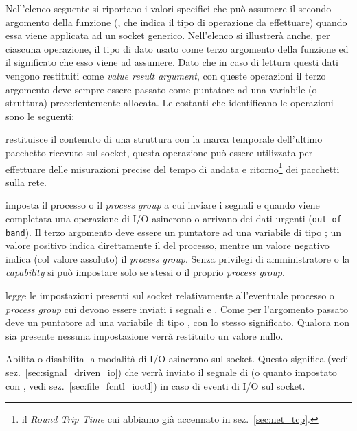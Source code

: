 Nell'elenco seguente si riportano i valori specifici che può assumere il
secondo argomento della funzione  (, che indica il
tipo di operazione da effettuare) quando essa viene applicata ad un socket
generico. Nell'elenco si illustrerà anche, per ciascuna operazione, il tipo di
dato usato come terzo argomento della funzione ed il significato che esso
viene ad assumere.  Dato che in caso di lettura questi dati vengono restituiti
come \textit{value result argument}, con queste operazioni il terzo argomento
deve sempre essere passato come puntatore ad una variabile (o struttura)
precedentemente allocata. Le costanti che identificano le operazioni sono le
seguenti:
\begin{basedescript}{\desclabelwidth{1.5cm}\desclabelstyle{\nextlinelabel}}
\item[\constd{SIOCGSTAMP}] restituisce il contenuto di una struttura
   con la marca temporale dell'ultimo pacchetto ricevuto sul
  socket, questa operazione può essere utilizzata per effettuare delle
  misurazioni precise del tempo di andata e ritorno\footnote{il \textit{Round
      Trip Time} cui abbiamo già accennato in sez.~\ref{sec:net_tcp}.} dei
  pacchetti sulla rete.

\item[\constd{SIOCSPGRP}] imposta il processo o il \textit{process group} a
  cui inviare i segnali  e  quando viene
  completata una operazione di I/O asincrono o arrivano dei dati urgenti
  (\texttt{out-of-band}). Il terzo argomento deve essere un puntatore ad una
  variabile di tipo ; un valore positivo indica direttamente il
   del processo, mentre un valore negativo indica (col valore
  assoluto) il \textit{process group}. Senza privilegi di amministratore o la
  \textit{capability}  si può impostare solo se stessi o il
  proprio \textit{process group}.

\item[\constd{SIOCGPGRP}] legge le impostazioni presenti sul socket
  relativamente all'eventuale processo o \textit{process group} cui devono
  essere inviati i segnali  e . Come per
   l'argomento passato deve un puntatore ad una variabile di
  tipo , con lo stesso significato.  Qualora non sia presente
  nessuna impostazione verrà restituito un valore nullo.

\item[\const{FIOASYNC}] Abilita o disabilita la modalità di I/O asincrono sul
  socket. Questo significa (vedi sez.~\ref{sec:signal_driven_io}) che verrà
  inviato il segnale di  (o quanto impostato con
  , vedi sez.~\ref{sec:file_fcntl_ioctl}) in caso di eventi
  di I/O sul socket.
\end{basedescript}

